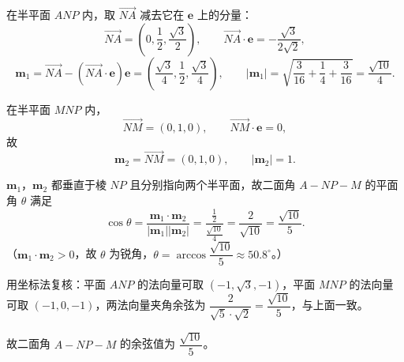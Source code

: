 \begin{answer}
在半平面 $ANP$ 内，取 $\overrightarrow{NA}$ 减去它在 $\boldsymbol e$ 上的分量：
\nopagebreak[4]
\[\overrightarrow{NA}=\left(0,\frac12,\frac{\sqrt3}2\right),\qquad
\overrightarrow{NA}\cdot\boldsymbol e=-\frac{\sqrt3}{2\sqrt2},\]
\nopagebreak[4]
\[\boldsymbol m_1=\overrightarrow{NA}-\left(\overrightarrow{NA}\cdot\boldsymbol e\right)\boldsymbol e
=\left(\frac{\sqrt3}4,\frac12,\frac{\sqrt3}4\right),\qquad
|\boldsymbol m_1|=\sqrt{\frac3{16}+\frac14+\frac3{16}}=\frac{\sqrt{10}}4 .\]

在半平面 $MNP$ 内，
\nopagebreak[4]
\[\overrightarrow{NM}=\left(0,1,0\right),\qquad \overrightarrow{NM}\cdot\boldsymbol e=0,\]
故
\nopagebreak[4]
\[\boldsymbol m_2=\overrightarrow{NM}=(0,1,0),\qquad |\boldsymbol m_2|=1 .\]

$\boldsymbol m_1$，$\boldsymbol m_2$ 都垂直于棱 $NP$ 且分别指向两个半平面，故二面角 $A-NP-M$ 的平面角 $\theta$ 满足
\nopagebreak[4]
\[\cos\theta=\frac{\boldsymbol m_1\cdot\boldsymbol m_2}{|\boldsymbol m_1||\boldsymbol m_2|}
=\frac{\frac12}{\frac{\sqrt{10}}4}=\frac{2}{\sqrt{10}}=\frac{\sqrt{10}}5 .\]
（$\boldsymbol m_1\cdot\boldsymbol m_2>0$，故 $\theta$ 为锐角，$\theta=\arccos\dfrac{\sqrt{10}}5\approx 50.8^\circ$。）

用坐标法复核：平面 $ANP$ 的法向量可取 $(-1,\sqrt3,-1)$，平面 $MNP$ 的法向量可取 $(-1,0,-1)$，两法向量夹角余弦为 $\dfrac{2}{\sqrt5\cdot\sqrt2}=\dfrac{\sqrt{10}}5$，与上面一致。

故二面角 $A-NP-M$ 的余弦值为 $\dfrac{\sqrt{10}}5$。



\end{answer}
